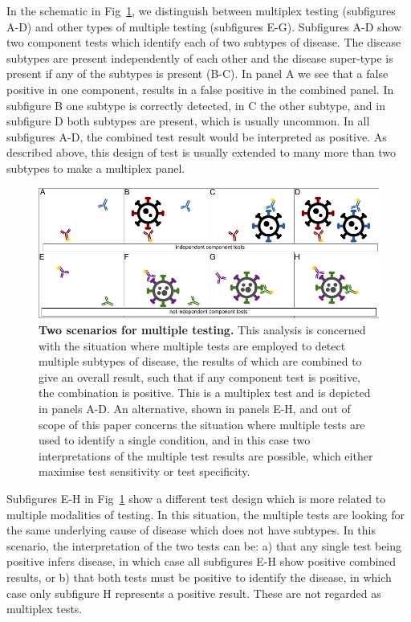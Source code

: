 \documentclass[10pt,letterpaper]{article}
\begin{document}
In the schematic in Fig~\ref{fig1}, we distinguish between multiplex testing (subfigures A-D) and other types of multiple testing (subfigures E-G). Subfigures A-D show two component tests which identify each of two subtypes of disease. The disease subtypes are present independently of each other and the disease super-type is present if any of the subtypes is present (B-C). In panel A we see that a false positive in one component, results in a false positive in the combined panel. In subfigure B one subtype is correctly detected, in C the other subtype, and in subfigure D both subtypes are present, which is usually uncommon. In all subfigures A-D, the combined test result would be interpreted as positive. As described above, this design of test is usually extended to many more than two subtypes to make a multiplex panel.

\begin{figure}[!h]
\centerline{\includegraphics{fig/fig1-testerror.pdf}}
\caption{{\bf Two scenarios for multiple testing.}
This analysis is concerned with the situation where multiple tests are employed to detect multiple subtypes of disease, the results of which are combined to give an overall result, such that if any component test is positive, the combination is positive. This is a multiplex test and is depicted in panels A-D. An alternative, shown in panels E-H, and out of scope of this paper concerns the situation where multiple tests are used to identify a single condition, and in this case two interpretations of the multiple test results are possible, which either maximise test sensitivity or test specificity.}
\label{fig1}
\end{figure}

Subfigures E-H in Fig~\ref{fig1} show a different test design which is more related to multiple modalities of testing\cite{weinstein2005}. In this situation, the multiple tests are looking for the same underlying cause of disease which does not have subtypes. In this scenario, the interpretation of the two tests can be: a) that any single test being positive infers disease, in which case all subfigures E-H show positive combined results, or b) that both tests must be positive to identify the disease, in which case only subfigure H represents a positive result. These are not regarded as multiplex tests.
\end{document}
